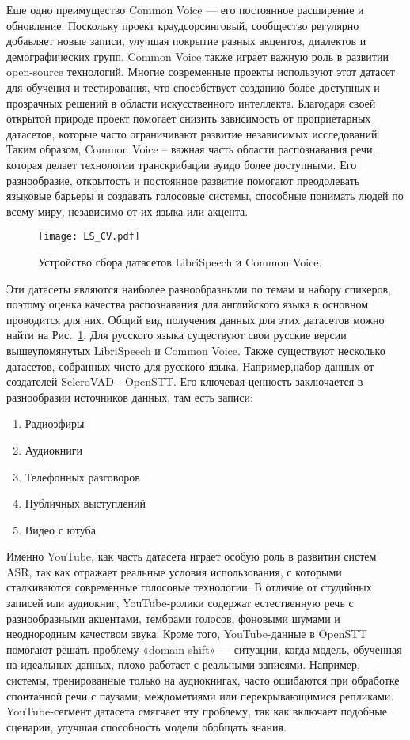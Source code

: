 Еще одно преимущество Common Voice — его постоянное расширение и обновление. Поскольку проект краудсорсинговый, сообщество регулярно добавляет новые записи, улучшая покрытие разных акцентов, диалектов и демографических групп.
Common Voice также играет важную роль в развитии open-source технологий.
Многие современные проекты используют этот датасет для обучения и тестирования, что способствует созданию более доступных и прозрачных решений в области искусственного интеллекта.
Благодаря своей открытой природе проект помогает снизить зависимость от проприетарных датасетов, которые часто ограничивают развитие независимых исследований.
Таким образом, Common Voice -- важная часть области распознавания речи, которая делает технологии транскрибации ауидо более доступными.
Его разнообразие, открытость и постоянное развитие помогают преодолевать языковые барьеры и создавать голосовые системы, способные понимать людей по всему миру, независимо от их языка или акцента.

\begin{figure}[!t]
  \centering
  \texttt{[image: LS\_CV.pdf]}
  \caption{Устройство сбора датасетов LibriSpeech и Common Voice.}
  \label{fig:ls_cv}
\end{figure}

Эти датасеты являются наиболее разнообразными по темам и набору спикеров, поэтому оценка качества распознавания для английского языка в основном проводится для них.
Общий вид получения данных для этих датасетов можно найти на Рис.~\ref{fig:ls_cv}.
Для русского языка существуют свои русские версии вышеупомянутых LibriSpeech и Common Voice.
Также существуют несколько датасетов, собранных чисто для русского языка. 
Например,набор данных от создателей SeleroVAD - OpenSTT. 
Его ключевая ценность заключается в разнообразии источников данных, там есть записи: 
\begin{enumerate}
  \item Радиоэфиры
  \item Аудиокниги
  \item Телефонных разговоров
  \item Публичных выступлений
  \item Видео с ютуба
\end{enumerate}
Именно YouTube, как часть датасета играет особую роль в развитии систем ASR, так как отражает реальные условия использования, с которыми сталкиваются современные голосовые технологии.
В отличие от студийных записей или аудиокниг, YouTube-ролики содержат естественную речь с разнообразными акцентами, тембрами голосов, фоновыми шумами и неоднородным качеством звука. 
Кроме того, YouTube-данные в OpenSTT помогают решать проблему «domain shift» — ситуации, когда модель, обученная на идеальных данных, плохо работает с реальными записями.
Например, системы, тренированные только на аудиокнигах, часто ошибаются при обработке спонтанной речи с паузами, междометиями или перекрывающимися репликами.
YouTube-сегмент датасета смягчает эту проблему, так как включает подобные сценарии, улучшая способность модели обобщать знания.

